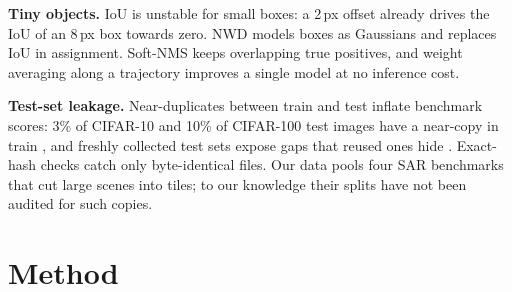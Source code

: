 \documentclass[10pt,twocolumn,letterpaper]{article}
\begin{document}
\textbf{Tiny objects.} IoU is unstable for small boxes: a 2\,px offset already drives the IoU of an 8\,px box towards zero. NWD \cite{wang2021nwd} models boxes as Gaussians and replaces IoU in assignment. Soft-NMS \cite{bodla2017softnms} keeps overlapping true positives, and weight averaging along a trajectory \cite{izmailov2018swa,wortsman2022soups} improves a single model at no inference cost.

\textbf{Test-set leakage.} Near-duplicates between train and test inflate benchmark scores: 3\% of CIFAR-10 and 10\% of CIFAR-100 test images have a near-copy in train \cite{barz2020cifair}, and freshly collected test sets expose gaps that reused ones hide \cite{recht2019imagenet}. Exact-hash checks catch only byte-identical files. Our data pools four SAR benchmarks \cite{li2024sardet,zhang2025rsar,wang2025m4sar,wei2020hrsid} that cut large scenes into tiles; to our knowledge their splits have not been audited for such copies.

\section{Method}
\label{sec:method}
\end{document}

